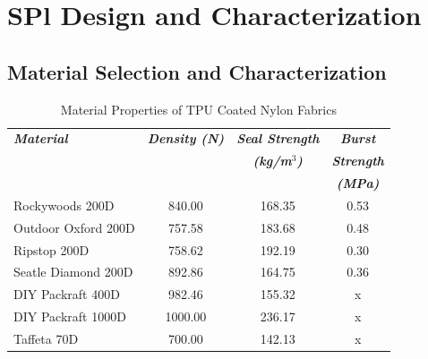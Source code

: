 \documentclass[letterpaper, 10 pt, conference]{ieeeconf}  %
\begin{document}





 
\section{SPl Design and Characterization} 

\subsection{Material Selection and Characterization}
\label{sec:mat_select}


\begin{table}[t!]
\caption{Material Properties of TPU Coated Nylon Fabrics} 
\label{tab:materialproperty_table}
	\begin{tabularx}{0.48\textwidth}{l|c|c|c}   \toprule\toprule
    \centering
    \small
    \setlength\tabcolsep{11pt}
	\textbf{\emph{Material}} & \textbf{\emph{Density (N) }} & \textbf{\emph{Seal Strength}} & \textbf{\emph{Burst }} \\[-3pt]
                             &                              & \textbf{\emph{(kg/m$^3$)}} & \textbf{\emph{Strength}}\\
                             &                              &                            & \textbf{\emph{(MPa)}}\\\midrule
	Rockywoods 200D &840.00 &168.35 & 0.53 \\
    Outdoor Oxford 200D  &757.58 &  183.68 & 0.48\\
    Ripstop 200D &758.62 & 192.19 & 0.30\\
    Seatle Diamond 200D &892.86 & 164.75 & 0.36\\
    DIY Packraft 400D & 982.46& 155.32 & x\\
    DIY Packraft 1000D &1000.00 & 236.17 & x\\
    Taffeta 70D &700.00& 142.13 & x\\\bottomrule 
    \hline
	\end{tabularx}
\end{table}
\end{document}
